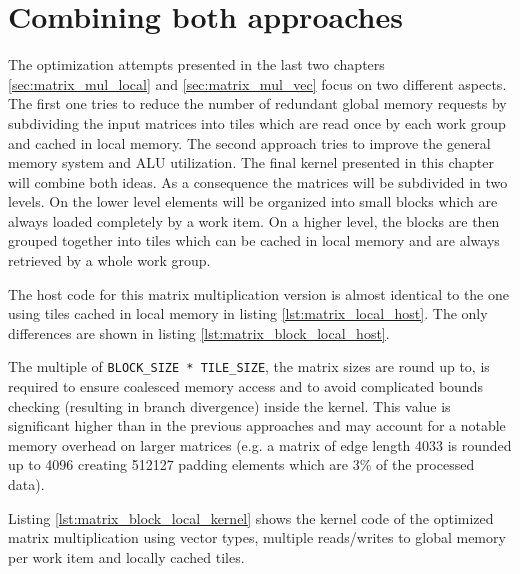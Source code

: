 \section{Combining both approaches}
The optimization attempts presented in the last two chapters \ref{sec:matrix_mul_local} and \ref{sec:matrix_mul_vec} focus on two different aspects. The first one tries to reduce the number of redundant global memory requests by subdividing the input matrices into tiles which are read once by each work group and cached in local memory. The second approach tries to improve the general memory system and ALU utilization. The final kernel presented in this chapter will combine both ideas.
As a consequence the matrices will be subdivided in two levels. On the lower level elements will be organized into small blocks which are always loaded completely by a work item. On a higher level, the blocks are then grouped together into tiles which can be cached in local memory and are always retrieved by a whole work group.

The host code for this matrix multiplication version is almost identical to the one using tiles cached in local memory in listing \ref{lst:matrix_local_host}. The only differences are shown in listing \ref{lst:matrix_block_local_host}.



The multiple of \lstinline!BLOCK_SIZE * TILE_SIZE!, the matrix sizes are round up to, is required to ensure coalesced memory access and to avoid complicated bounds checking (resulting in branch divergence) inside the kernel. This value is significant higher than in the previous approaches and may account for a notable memory overhead on larger matrices (e.g. a matrix of edge length 4033 is rounded up to 4096 creating 512127 padding elements which are 3\% of the processed data).

Listing \ref{lst:matrix_block_local_kernel} shows the kernel code of the optimized matrix multiplication using vector types, multiple reads/writes to global memory per work item and locally cached tiles.



